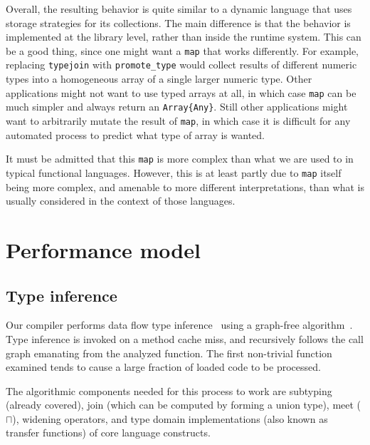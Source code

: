 Overall, the resulting behavior is quite similar to a dynamic
language that uses storage strategies \cite{Bolz2013} for its
collections.
The main difference is that the behavior is implemented at the
library level, rather than inside the runtime system.
This can be a good thing, since one might want a \texttt{map} that
works differently.
For example, replacing \texttt{typejoin} with \texttt{promote\_type}
would collect results of different numeric types into a
homogeneous array of a single larger numeric type.
Other applications might not want to use typed arrays at all, in
which case \texttt{map} can be much simpler and always return an
\texttt{Array\{Any\}}.
Still other applications might want to arbitrarily mutate the result
of \texttt{map}, in which case it is difficult for any automated
process to predict what type of array is wanted.

It must be admitted that this \texttt{map} is more complex than
what we are used to in typical functional languages.
However, this is at least partly due to \texttt{map} itself
being more complex, and amenable to more different interpretations,
than what is usually considered in the context of those languages.



\section{Performance model}

\subsection{Type inference}

Our compiler performs data flow type inference~\cite{kaplanullman,abstractinterp}
using a graph-free algorithm~\cite{graphfree}.
Type inference is invoked on a method cache miss, and recursively follows the
call graph emanating from the analyzed function.
The first non-trivial function examined tends to cause a large fraction of
loaded code to be processed.

The algorithmic components needed for this process to work are subtyping
(already covered), join (which can be computed by forming a union type),
meet ($\sqcap$), widening operators, and type domain implementations
(also known as transfer functions) of core language constructs.

